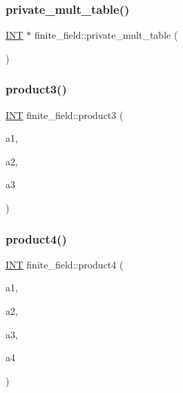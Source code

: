 \mbox{\label{classfinite__field_a77af62bb29c0a0122284dbc698873511}} 
\subsubsection{\texorpdfstring{private\+\_\+mult\+\_\+table()}{private\_mult\_table()}}
{\footnotesize\ttfamily \mbox{\hyperlink{galois_8h_a09fddde158a3a20bd2dcadb609de11dc}{I\+NT}} $\ast$ finite\+\_\+field\+::private\+\_\+mult\+\_\+table (\begin{DoxyParamCaption}{ }\end{DoxyParamCaption})}

\mbox{\label{classfinite__field_ada2d8411665cb720cf2bf78ba41a2f1d}} 
\subsubsection{\texorpdfstring{product3()}{product3()}}
{\footnotesize\ttfamily \mbox{\hyperlink{galois_8h_a09fddde158a3a20bd2dcadb609de11dc}{I\+NT}} finite\+\_\+field\+::product3 (\begin{DoxyParamCaption}\item[{\mbox{\hyperlink{galois_8h_a09fddde158a3a20bd2dcadb609de11dc}{I\+NT}}}]{a1,  }\item[{\mbox{\hyperlink{galois_8h_a09fddde158a3a20bd2dcadb609de11dc}{I\+NT}}}]{a2,  }\item[{\mbox{\hyperlink{galois_8h_a09fddde158a3a20bd2dcadb609de11dc}{I\+NT}}}]{a3 }\end{DoxyParamCaption})}

\mbox{\label{classfinite__field_a0f2624a7b7196967764ac8b5af016e0f}} 
\subsubsection{\texorpdfstring{product4()}{product4()}}
{\footnotesize\ttfamily \mbox{\hyperlink{galois_8h_a09fddde158a3a20bd2dcadb609de11dc}{I\+NT}} finite\+\_\+field\+::product4 (\begin{DoxyParamCaption}\item[{\mbox{\hyperlink{galois_8h_a09fddde158a3a20bd2dcadb609de11dc}{I\+NT}}}]{a1,  }\item[{\mbox{\hyperlink{galois_8h_a09fddde158a3a20bd2dcadb609de11dc}{I\+NT}}}]{a2,  }\item[{\mbox{\hyperlink{galois_8h_a09fddde158a3a20bd2dcadb609de11dc}{I\+NT}}}]{a3,  }\item[{\mbox{\hyperlink{galois_8h_a09fddde158a3a20bd2dcadb609de11dc}{I\+NT}}}]{a4 }\end{DoxyParamCaption})}

